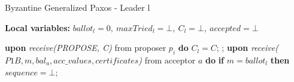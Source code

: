 \begin{algorithm} 
	\caption{Byzantine Generalized Paxos - Leader l}
	\label{BFT-Lead}
	\textbf{Local variables:} $ballot_l = 0,\ maxTried_l = \bot,\ C_l = \bot,\ accepted = \bot$
	\begin{algorithmic}[1]
		\State \textbf{upon} \textit{receive(PROPOSE, C)} from proposer $p_i$ \textbf{do} 
		\State \hspace{\algorithmicindent} $C_l = C$;
		\State \hspace{\algorithmicindent} ;
		\State
		\State \textbf{upon} \textit{receive($P1B, m, bal_a,acc\_values, certificates$)} from acceptor $a$ \textbf{do}
		\State \hspace{\algorithmicindent} \textbf{if} $m = ballot_l$ \textbf{then}
		\State \hspace{\algorithmicindent}\hspace{\algorithmicindent}\hspace{\algorithmicindent}
		$sequence = \bot$;
		

\end{algorithmic}
\end{algorithm}
